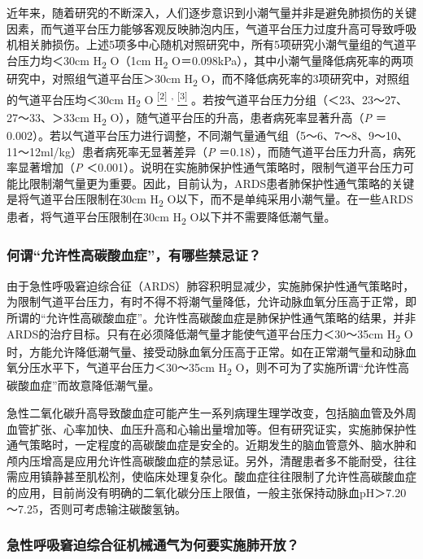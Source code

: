 近年来，随着研究的不断深入，人们逐步意识到小潮气量并非是避免肺损伤的关键因素，而气道平台压力能够客观反映肺泡内压，气道平台压力过度升高可导致呼吸机相关肺损伤。上述5项多中心随机对照研究中，所有5项研究小潮气量组的气道平台压力均＜30cm
H\textsubscript{2} O（1cm H\textsubscript{2}
O＝0.098kPa），其中小潮气量降低病死率的两项研究中，对照组气道平台压＞30cm
H\textsubscript{2}
O，而不降低病死率的3项研究中，对照组的气道平台压均＜30cm
H\textsubscript{2} O
\protect\hyperlink{text00011.htmlux5cux23ch2-10}{\textsuperscript{{[}2{]}}}
\textsuperscript{,}
\protect\hyperlink{text00011.htmlux5cux23ch3-10}{\textsuperscript{{[}3{]}}}
。若按气道平台压力分组（＜23、23～27、27～33、＞33cm H\textsubscript{2}
O），随气道平台压的升高，患者病死率显著升高（\emph{P}
＝0.002）。若以气道平台压力进行调整，不同潮气量通气组（5～6、7～8、9～10、11～12ml/kg）患者病死率无显著差异（\emph{P}
＝0.18），而随气道平台压力升高，病死率显著增加（\emph{P}
＜0.001）。说明在实施肺保护性通气策略时，限制气道平台压力可能比限制潮气量更为重要。因此，目前认为，ARDS患者肺保护性通气策略的关键是将气道平台压限制在30cm
H\textsubscript{2}
O以下，而不是单纯采用小潮气量。在一些ARDS患者，将气道平台压限制在30cm
H\textsubscript{2} O以下并不需要降低潮气量。

\subsubsection{何谓“允许性高碳酸血症”，有哪些禁忌证？}

由于急性呼吸窘迫综合征（ARDS）肺容积明显减少，实施肺保护性通气策略时，为限制气道平台压力，有时不得不将潮气量降低，允许动脉血氧分压高于正常，即所谓的“允许性高碳酸血症”。允许性高碳酸血症是肺保护性通气策略的结果，并非ARDS的治疗目标。只有在必须降低潮气量才能使气道平台压力＜30～35cm
H\textsubscript{2}
O时，方能允许降低潮气量、接受动脉血氧分压高于正常。如在正常潮气量和动脉血氧分压水平下，气道平台压力＜30～35cm
H\textsubscript{2}
O，则不可为了实施所谓“允许性高碳酸血症”而故意降低潮气量。

急性二氧化碳升高导致酸血症可能产生一系列病理生理学改变，包括脑血管及外周血管扩张、心率加快、血压升高和心输出量增加等。但有研究证实，实施肺保护性通气策略时，一定程度的高碳酸血症是安全的。近期发生的脑血管意外、脑水肿和颅内压增高是应用允许性高碳酸血症的禁忌证。另外，清醒患者多不能耐受，往往需应用镇静甚至肌松剂，使临床处理复杂化。酸血症往往限制了允许性高碳酸血症的应用，目前尚没有明确的二氧化碳分压上限值，一般主张保持动脉血pH＞7.20～7.25，否则可考虑输注碳酸氢钠。

\subsubsection{急性呼吸窘迫综合征机械通气为何要实施肺开放？}

